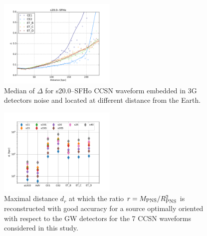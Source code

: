\begin{figure}
  \centering
  \includegraphics[width=0.5\textwidth]{plots/s20--SFHo_all3G}
  \caption{Median of $\Delta$ for s20.0--SFHo CCSN waveform embedded in 3G detectors noise and located at different distance from the Earth. } \label{fig:s20--SFHo_all3G}
\end{figure}

\begin{figure}
  \centering
  \includegraphics[width=0.5\textwidth]{plots/dist_allwvfs_2G3G}
  \caption{Maximal distance $d_{r}$ at which the ratio $r=M_{\rm PNS}/R_{\rm PNS}^2$ is reconstructed
    with good accuracy for a source optimally oriented with respect to the GW detectors for the 7 CCSN waveforms considered in this study.} \label{fig:distances}
\end{figure}



